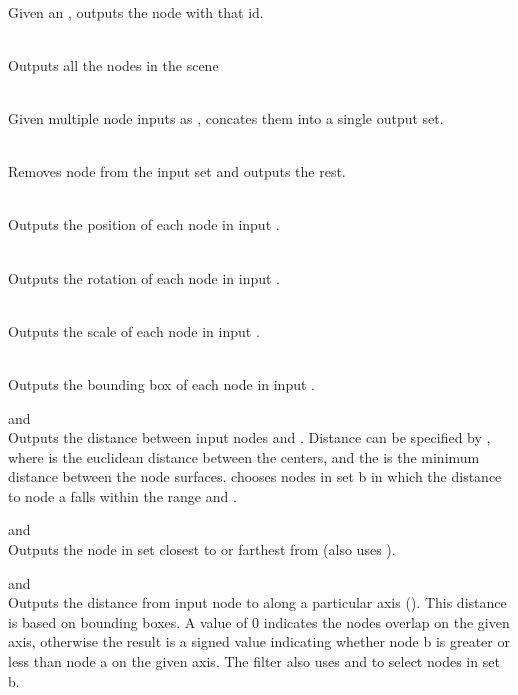 \begin{description}
	\item{} \\
		Given an , outputs the node with that id.
	\item{} \\
		Outputs all the nodes in the scene
	\item{} \\
		Given multiple node inputs as , concates them into a single output set.
	\item{} \\
		Removes node  from the input set  and outputs the rest.
	\item{} \\
		Outputs the position of each node in input .
	\item{} \\
		Outputs the rotation of each node in input .
	\item{} \\
		Outputs the scale of each node in input .
	\item{} \\
		Outputs the bounding box of each node in input .
	\item{ and } \\
		Outputs the distance between input nodes  and . Distance can be specified by , where  is the euclidean distance between the centers, and the  is the minimum distance between the node surfaces.  chooses nodes in set b in which the distance to node a falls within the range  and .
	\item{ and } \\
		Outputs the node in set  closest to or farthest from  (also uses ).
	\item{ and } \\
		Outputs the distance from input node  to  along a particular axis (). This distance is based on bounding boxes. A value of 0 indicates the nodes overlap on the given axis, otherwise the result is a signed value indicating whether node b is greater or less than node a on the given axis. The  filter also uses  and  to select nodes in set b.

\end{description}

